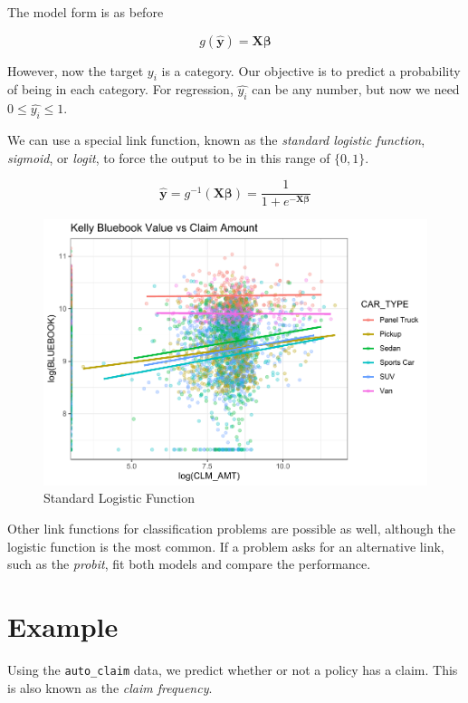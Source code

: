 \documentclass[]{book}
\begin{document}
The model form is as before

\[g(\mathbf{\hat{y}}) = \mathbf{X} \mathbf{\beta}\]

However, now the target \(y_i\) is a category. Our objective is to predict a probability of being in each category. For regression, \(\hat{y_i}\) can be any number, but now we need \(0 \leq \hat{y_i} \leq 1\).

We can use a special link function, known as the \emph{standard logistic function}, \emph{sigmoid}, or \emph{logit}, to force the output to be in this range of \(\{0,1\}\).

\[\mathbf{\hat{y}} = g^{-1}(\mathbf{X} \mathbf{\beta}) = \frac{1}{1 + e^{-\mathbf{X} \mathbf{\beta}}}\]

\begin{figure}
\centering
\includegraphics{Exam-PA-Study-Manual_files/figure-latex/unnamed-chunk-100-1.pdf}
\caption{\label{fig:unnamed-chunk-100}Standard Logistic Function}
\end{figure}

Other link functions for classification problems are possible as well, although the logistic function is the most common. If a problem asks for an alternative link, such as the \emph{probit}, fit both models and compare the performance.

\hypertarget{example-2}{%
\section{Example}\label{example-2}}

Using the \texttt{auto\_claim} data, we predict whether or not a policy has a claim. This is also known as the \emph{claim frequency}.
\end{document}

